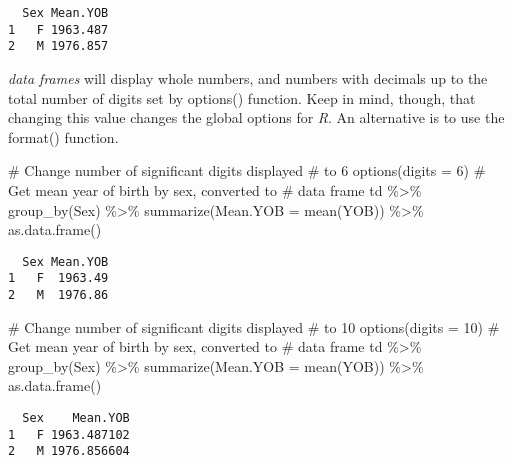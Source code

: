 \documentclass[
  12pt,
  letterpaper]{article}
\newenvironment{Shaded}{\begin{snugshade}}{\end{snugshade}}
\newcommand{\AttributeTok}[1]{\textcolor[rgb]{0.40,0.45,0.13}{#1}}
\newcommand{\CommentTok}[1]{\textcolor[rgb]{0.37,0.37,0.37}{#1}}
\newcommand{\DecValTok}[1]{\textcolor[rgb]{0.68,0.00,0.00}{#1}}
\newcommand{\FunctionTok}[1]{\textcolor[rgb]{0.28,0.35,0.67}{#1}}
\newcommand{\NormalTok}[1]{\textcolor[rgb]{0.00,0.23,0.31}{#1}}
\newcommand{\SpecialCharTok}[1]{\textcolor[rgb]{0.37,0.37,0.37}{#1}}
\renewcommand\texttt[1]{{\ttfamily\color{BrickRed}#1}}
\begin{document}
\begin{verbatim}
  Sex Mean.YOB
1   F 1963.487
2   M 1976.857
\end{verbatim}

\emph{data frames} will display whole numbers, and numbers with decimals
up to the total number of digits set by \texttt{options()} function.
Keep in mind, though, that changing this value changes the global
options for \emph{R}. An alternative is to use the \texttt{format()}
function.

\begin{Shaded}
\begin{Highlighting}[]
\CommentTok{\# Change number of significant digits displayed}
\CommentTok{\# to 6}
\FunctionTok{options}\NormalTok{(}\AttributeTok{digits =} \DecValTok{6}\NormalTok{)}
\CommentTok{\# Get mean year of birth by sex, converted to}
\CommentTok{\# data frame}
\NormalTok{td }\SpecialCharTok{\%\textgreater{}\%}
    \FunctionTok{group\_by}\NormalTok{(Sex) }\SpecialCharTok{\%\textgreater{}\%}
    \FunctionTok{summarize}\NormalTok{(}\AttributeTok{Mean.YOB =} \FunctionTok{mean}\NormalTok{(YOB)) }\SpecialCharTok{\%\textgreater{}\%}
    \FunctionTok{as.data.frame}\NormalTok{()}
\end{Highlighting}
\end{Shaded}

\begin{verbatim}
  Sex Mean.YOB
1   F  1963.49
2   M  1976.86
\end{verbatim}

\begin{Shaded}
\begin{Highlighting}[]
\CommentTok{\# Change number of significant digits displayed}
\CommentTok{\# to 10}
\FunctionTok{options}\NormalTok{(}\AttributeTok{digits =} \DecValTok{10}\NormalTok{)}
\CommentTok{\# Get mean year of birth by sex, converted to}
\CommentTok{\# data frame}
\NormalTok{td }\SpecialCharTok{\%\textgreater{}\%}
    \FunctionTok{group\_by}\NormalTok{(Sex) }\SpecialCharTok{\%\textgreater{}\%}
    \FunctionTok{summarize}\NormalTok{(}\AttributeTok{Mean.YOB =} \FunctionTok{mean}\NormalTok{(YOB)) }\SpecialCharTok{\%\textgreater{}\%}
    \FunctionTok{as.data.frame}\NormalTok{()}
\end{Highlighting}
\end{Shaded}

\begin{verbatim}
  Sex    Mean.YOB
1   F 1963.487102
2   M 1976.856604
\end{verbatim}
\end{document}
